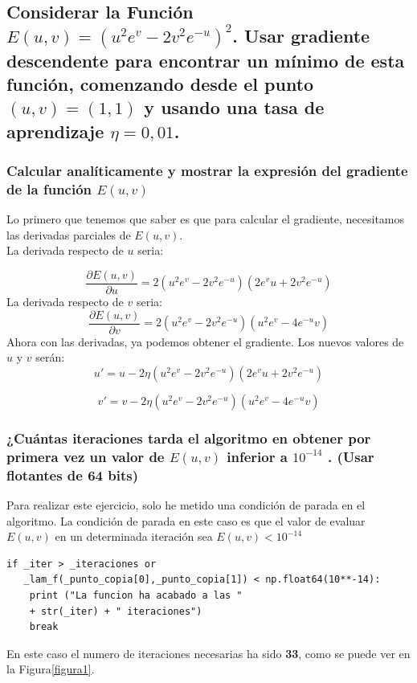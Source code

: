 \documentclass[12pt,a4paper]{article}
\begin{document}
\subsection{Considerar la Función \(  E(u, v) = (u^2e^v - 2v^2e^{-u})^2\). Usar gradiente descendente para encontrar un mínimo de esta función, comenzando desde el punto \((u, v) = (1, 1)\) y usando una tasa de aprendizaje \(\eta = 0,01\).}
\subsubsection{Calcular analíticamente y mostrar la expresión del gradiente de la función \(E(u, v)\)}
Lo primero que tenemos que saber es que para calcular el gradiente, necesitamos las derivadas parciales de \(E(u,v)\). \\
La derivada respecto de \(u\) seria: 

\begin{equation}
\frac{\partial E(u,v)}
{\partial u} = 2\left(u^2e^v-2v^2e^{-u}\right)\left(2e^vu+2v^2e^{-u}\right)
\end{equation}
La derivada respecto de \(v\) seria: 
\begin{equation}
\frac{\partial E(u,v)}
{\partial v} = 2\left(u^2e^v-2v^2e^{-u}\right)\left(u^2e^v-4e^{-u}v\right)
\end{equation}
Ahora con las derivadas, ya podemos obtener el gradiente. Los nuevos valores de \(u\) y \(v\) serán:
\begin{equation}
u' = u - 2\eta\left(u^2e^v-2v^2e^{-u}\right)\left(2e^vu+2v^2e^{-u}\right)
\end{equation}

\begin{equation}
v' = v - 2\eta\left(u^2e^v-2v^2e^{-u}\right)\left(u^2e^v-4e^{-u}v\right)
\end{equation}

\subsubsection{¿Cuántas iteraciones tarda el algoritmo en obtener por primera vez un valor de \(E(u, v)\) inferior a \(10^{-14}\) . (Usar flotantes de 64 bits)}
Para realizar este ejercicio, solo he metido una condición de parada en el algoritmo. La condición de parada en este caso es que el valor de evaluar \(E(u,v)\) en un determinada iteración sea \(E(u,v)<10^{-14}\)

\begin{verbatim} 
if _iter > _iteraciones or 
   _lam_f(_punto_copia[0],_punto_copia[1]) < np.float64(10**-14):
	print ("La funcion ha acabado a las " 
	+ str(_iter) + " iteraciones")
	break
\end{verbatim}
En este caso el numero de iteraciones necesarias ha sido \textbf{33}, como se puede ver en la Figura\ref{figura1}.
\end{document}
